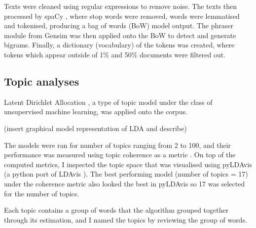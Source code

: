 Texts were cleaned using regular expressions to remove noise. The texts then processed by spaCy \parencite{spacy}, where stop words were removed, words were lemmatised and tokenised, producing a bag of words (BoW) model output. The phraser module from Gensim \parencite{rehurek_lrec} was then applied onto the BoW to detect and generate bigrams. Finally, a dictionary (vocabulary) of the tokens was created, where tokens which appear outside of 1\% and 50\% documents were filtered out. 

\subsection{Topic analyses}

Latent Dirichlet Allocation \parencite{blei2003latent}, a type of topic model under the class of unsupervised machine learning, was applied onto the corpus. 

(insert graphical model representation of LDA and describe)

The models were ran for number of topics ranging from 2 to 100, and their performance was measured using topic coherence as a metric \parencite{roder2015exploring}. On top of the computed metrics, I inspected the topic space that was visualised using pyLDAvis (a python port of LDAvis \parencite{sievert2014ldavis}). The best performing model (number of topics = 17) under the coherence metric also looked the best in pyLDAvis so 17 was selected for the number of topics.

Each topic contains a group of words that the algorithm grouped together through its estimation, and I named the topics by reviewing the group of words.

